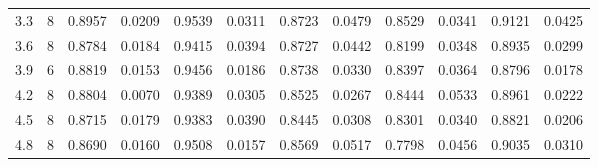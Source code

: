 \begin{tabular}{rrrrrrrrrrrr}
       3.3 &     8 &   0.8957 & 0.0209 &               0.9539 & 0.0311 &                   0.8723 & 0.0479 &               0.8529 & 0.0341 &                       0.9121 & 0.0425 \\
       3.6 &     8 &   0.8784 & 0.0184 &               0.9415 & 0.0394 &                   0.8727 & 0.0442 &               0.8199 & 0.0348 &                       0.8935 & 0.0299 \\
       3.9 &     6 &   0.8819 & 0.0153 &               0.9456 & 0.0186 &                   0.8738 & 0.0330 &               0.8397 & 0.0364 &                       0.8796 & 0.0178 \\
       4.2 &     8 &   0.8804 & 0.0070 &               0.9389 & 0.0305 &                   0.8525 & 0.0267 &               0.8444 & 0.0533 &                       0.8961 & 0.0222 \\
       4.5 &     8 &   0.8715 & 0.0179 &               0.9383 & 0.0390 &                   0.8445 & 0.0308 &               0.8301 & 0.0340 &                       0.8821 & 0.0206 \\
       4.8 &     8 &   0.8690 & 0.0160 &               0.9508 & 0.0157 &                   0.8569 & 0.0517 &               0.7798 & 0.0456 &                       0.9035 & 0.0310 \\
\bottomrule
\end{tabular}
